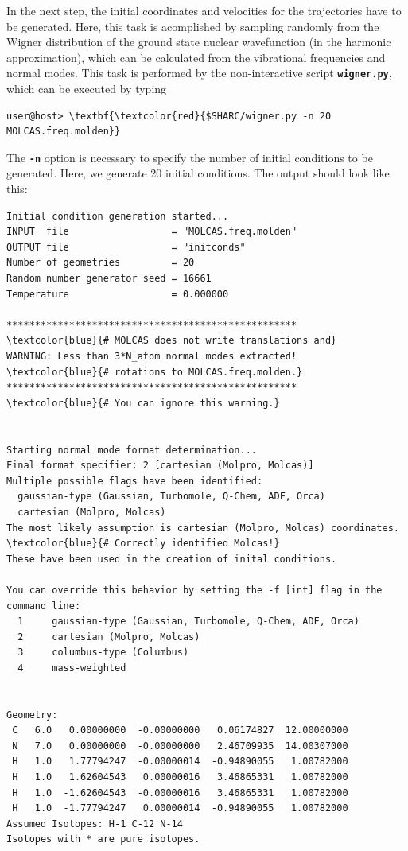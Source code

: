 \documentclass[a4paper,11pt,DIV=15,openany]{scrbook}
\newcommand{\ttt}[1]{\textbf{\texttt{#1}}}
\begin{document}
In the next step, the initial coordinates and velocities for the trajectories have to be generated.
Here, this task is acomplished by sampling randomly from the Wigner distribution of the ground state nuclear wavefunction (in the harmonic approximation), which can be calculated from the vibrational frequencies and normal modes.
This task is performed by the non-interactive script \ttt{wigner.py}, which can be executed by typing
\begin{Verbatim}[commandchars=\\\{\}]
user@host> \textbf{\textcolor{red}{$SHARC/wigner.py -n 20 MOLCAS.freq.molden}}
\end{Verbatim}
The \ttt{-n} option is necessary to specify the number of initial conditions to be generated. 
Here, we generate 20 initial conditions. 
The output should look like this:
\begin{oframed}
\footnotesize\begin{Verbatim}[commandchars=\\\{\}]
Initial condition generation started...
INPUT  file                  = "MOLCAS.freq.molden"
OUTPUT file                  = "initconds"
Number of geometries         = 20
Random number generator seed = 16661
Temperature                  = 0.000000

***************************************************    \textcolor{blue}{# MOLCAS does not write translations and}
WARNING: Less than 3*N_atom normal modes extracted!    \textcolor{blue}{# rotations to MOLCAS.freq.molden.}
***************************************************    \textcolor{blue}{# You can ignore this warning.}


Starting normal mode format determination...
Final format specifier: 2 [cartesian (Molpro, Molcas)]
Multiple possible flags have been identified: 
  gaussian-type (Gaussian, Turbomole, Q-Chem, ADF, Orca) 
  cartesian (Molpro, Molcas)
The most likely assumption is cartesian (Molpro, Molcas) coordinates.    \textcolor{blue}{# Correctly identified Molcas!}
These have been used in the creation of inital conditions.

You can override this behavior by setting the -f [int] flag in the command line:
  1     gaussian-type (Gaussian, Turbomole, Q-Chem, ADF, Orca)
  2     cartesian (Molpro, Molcas)
  3     columbus-type (Columbus)
  4     mass-weighted


Geometry:
 C   6.0   0.00000000  -0.00000000   0.06174827  12.00000000 
 N   7.0   0.00000000  -0.00000000   2.46709935  14.00307000 
 H   1.0   1.77794247  -0.00000014  -0.94890055   1.00782000 
 H   1.0   1.62604543   0.00000016   3.46865331   1.00782000 
 H   1.0  -1.62604543  -0.00000016   3.46865331   1.00782000 
 H   1.0  -1.77794247   0.00000014  -0.94890055   1.00782000 
Assumed Isotopes: H-1 C-12 N-14 
Isotopes with * are pure isotopes.


\end{Verbatim}
\end{oframed}
\end{document}
